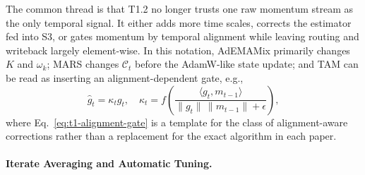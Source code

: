 The common thread is that T1.2 no longer trusts one raw momentum stream as the
only temporal signal.  It either adds more time scales, corrects the estimator
fed into S3, or gates momentum by temporal alignment while leaving routing and
writeback largely element-wise.  In this notation, AdEMAMix primarily changes
$K$ and $\omega_k$; MARS changes $\mathcal{C}_t$ before the AdamW-like state
update; and TAM can be read as inserting an alignment-dependent gate, e.g.,
\begin{equation}
  \widehat{g}_t = \kappa_t g_t, \quad
  \kappa_t = f\!\left(
    \frac{\langle g_t,m_{t-1}\rangle}
         {\|g_t\|\,\|m_{t-1}\|+\epsilon}
  \right),
  \label{eq:t1-alignment-gate}
\end{equation}
where Eq.~\eqref{eq:t1-alignment-gate} is a template for the class of
alignment-aware corrections rather than a replacement for the exact algorithm
in each paper.

\paragraph{Iterate Averaging and Automatic Tuning.}
\label{sec:t1-averaging-autotuning}

